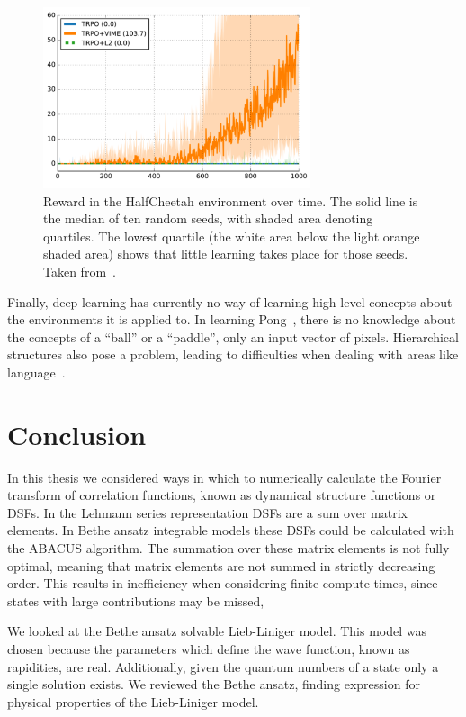 \documentclass[11pt, a4paper]{report} %
\begin{document}
\begin{figure}[tb!]
  \centering
  \includegraphics[width=0.7\textwidth]{rllearningtrouble.png}
  \caption{Reward in the HalfCheetah environment over time. The solid line is the median of ten random seeds, with shaded area denoting quartiles. The lowest quartile (the white area below the light orange shaded area) shows that little learning takes place for those seeds. Taken from~\cite{houthooft16_vime}.}
  \label{fig:halfcheetah}
\end{figure}



Finally, deep learning has currently no way of learning high level concepts about the environments it is applied to.
In learning Pong~\cite{mnih13_playin_atari_with_deep_reinf_learn,mnih15_human_level_contr_throug_deep_reinf_learn}, there is no knowledge about the concepts of a ``ball'' or a ``paddle'', only an input vector of pixels.
Hierarchical structures also pose a problem, leading to difficulties when dealing with areas like language~\cite{marcus18_deep_learn}. 


\section{Conclusion}

In this thesis we considered ways in which to numerically calculate the Fourier transform of correlation functions, known as dynamical structure functions or DSFs.
In the Lehmann series representation DSFs are a sum over matrix elements.
In Bethe ansatz integrable models these DSFs could be calculated with the ABACUS algorithm.
The summation over these matrix elements is not fully optimal, meaning that matrix elements are not summed in strictly decreasing order.
This results in inefficiency when considering finite compute times, since states with large contributions may be missed,

We looked at the Bethe ansatz solvable Lieb-Liniger model.
This model was chosen because the parameters which define the wave function, known as rapidities, are real.
Additionally, given the quantum numbers of a state only a single solution exists.
We reviewed the Bethe ansatz, finding expression for physical properties of the Lieb-Liniger model.
\end{document}

